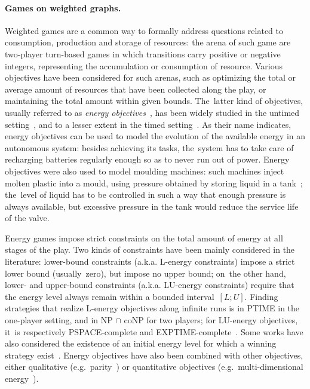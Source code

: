\paragraph{Games on weighted graphs.}
Weighted games are a common way to formally address questions
related to consumption, production and storage of resources: the arena
of such game are two-player turn-based games in which transitions
carry positive or negative integers, representing the accumulation or
consumption of resource.  Various objectives have been considered for
such arenas, such as optimizing the total or average amount of
resources that have been collected along the play, or maintaining the
total amount within given bounds. The~latter kind of objectives,
usually referred to as \emph{energy
objectives}~\cite{CdAHS03,BouyerFLMS08}, has been widely studied in
the untimed
setting~\cite{ChatterjeeD12,ChatterjeeDHR10,DDGRT10,FahrenbergJLS11,JLR13,
JLS15,VCDHRR15,BMRLL15,BHMRZ17,DM18}, and to a lesser extent in the
timed setting~\cite{BFLM10,qest2012-BLM}.
%
As their name indicates, energy objectives can be used to model the
evolution of the available energy in an autonomous system: besides
achieving its tasks, the~system has to take care of recharging
batteries regularly enough so as to never run out of power.  Energy
objectives were also used to model moulding machines: such machines
inject molten plastic into a mould, using pressure obtained by storing
liquid in a tank~\cite{CJLRR09}; the~level of liquid has to be
controlled in such a way that enough pressure is always available, but
excessive pressure in the tank would reduce the service life of the valve.

Energy games impose strict constraints on the total amount of energy
at all stages of the play. Two kinds of constraints have been mainly
considered in the literature: lower-bound constraints (a.k.a. L-energy constraints) impose a strict lower bound (usually~zero), but impose no
upper bound; on~the other hand, lower- and upper-bound constraints
(a.k.a. LU-energy constraints) require that the energy level always
remain within a bounded interval~$[L;U]$. Finding strategies that
realize L-energy objectives along infinite runs is in PTIME in the
one-player setting, and in NP $\cap$ coNP for two players;
for LU-energy objectives, it~is respectively PSPACE-complete
and EXPTIME-complete~\cite{BouyerFLMS08}. Some works have also considered
the existence of an initial energy level for which a winning strategy
exist~\cite{ChatterjeeDHR10}.
%
Energy objectives have also been combined with other objectives,
either qualitative (e.g.~parity~\cite{ChatterjeeD12}) or quantitative
objectives (e.g.~multi-dimensional
energy~\cite{ChatterjeeDHR10,FahrenbergJLS11,JLR13}). 

